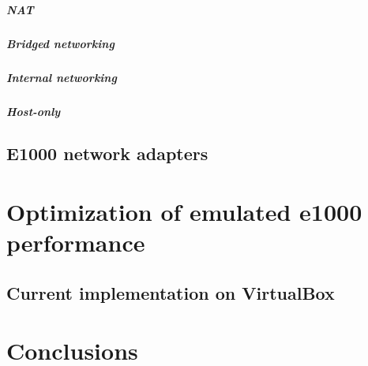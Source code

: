 \documentclass[a4paper, 12pt, titlepage]{report}
\begin{document}
\paragraph{NAT}
\paragraph{Bridged networking}
\paragraph{Internal networking}
\paragraph{Host-only}
\section{E1000 network adapters}
\chapter{Optimization of emulated e1000 performance}
\section{Current implementation on VirtualBox}
\chapter{Conclusions}
	
\end{document}

